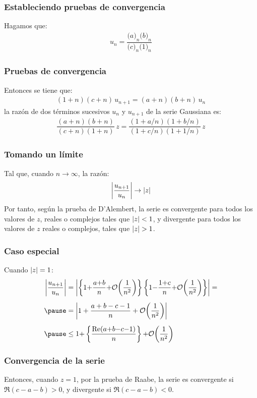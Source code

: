 \documentclass[12pt]{beamer}
\begin{document}
\begin{frame}
\frametitle{Estableciendo pruebas de convergencia}
Hagamos que:
\pause
\begin{align*}
u_{n} = \dfrac{\big( a \big)_{n} \big( b \big)_{n}}{\big( c \big)_{n} \big( 1 \big)_{n}}
\end{align*}
\end{frame}
\begin{frame}
\frametitle{Pruebas de convergencia}
Entonces se tiene que:
\pause
\begin{align}
(1 + n)(c + n) \, u_{n+1} = (a + n)(b +  n) \, u_{n}
\label{eq:ecuacion_01_01_01_12}
\end{align}
\pause
la razón de dos términos sucesivos $u_{n}$ y $u_{n+1}$ de la serie Gaussiana es:
\pause
\begin{align}
\dfrac{(a + n)(b +  n)}{(c + n)(1 +  n)} \, z = \dfrac{(1 + a/n)(1 + b/n)}{(1 + c/n)(1 + 1/n)} \, z
\label{eq:ecuacion_01_01_01_13}
\end{align}
\end{frame}
\begin{frame}
\frametitle{Tomando un límite}
Tal que, cuando $n \to \infty$, la razón:
\pause
\begin{align*}
\abs{\dfrac{u_{n+1}}{u_{n}}} \to \abs{z}
\end{align*}
\pause
Por tanto, según la prueba de D'Alembert, la serie es convergente para todos los valores de $z$, reales o complejos tales que $\abs{z} < 1$, y divergente para todos los valores de $z$ reales o complejos, tales que $\abs{z} > 1$.
\end{frame}
\begin{frame}
\frametitle{Caso especial}
Cuando $\abs{z} = 1$:
\pause
\begin{eqnarray}
\begin{aligned}[b]
\abs{\dfrac{u_{n+1}}{u_{n}}} &= \abs{\left\{ 1 {+} \dfrac{a {+} b}{n} {+} \order{\dfrac{1}{n^{2}}} \right\} \left\{ 1 {-} \dfrac{1 {+} c}{n} {+} \order{\dfrac{1}{n^{2}}} \right\}} = \\[0.5em] \pause
&= \abs{1 + \dfrac{a + b - c - 1}{n} + \order{\dfrac{1}{n^{2}}}} \\[0.5em] \pause
&\leq 1 {+} \left\{ \dfrac{\Re (a {+} b {-} c {-} 1)}{n} \right\} {+} \order{\dfrac{1}{n^{2}}}
\end{aligned}
\label{eq:eq:ecuacion_01_01_01_14}
\end{eqnarray}
\end{frame}
\begin{frame}
\frametitle{Convergencia de la serie}
Entonces, cuando $z = 1$, por la prueba de Raabe, la serie es convergente si $\Re (c - a - b) > 0$, y divergente si $\Re (c - a - b) < 0$.
\end{frame}
\end{document}
